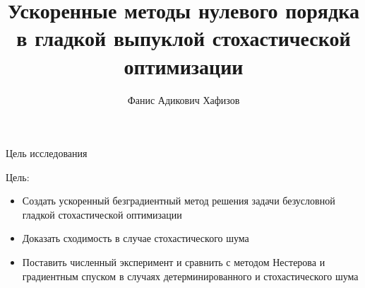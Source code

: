 \documentclass{beamer}
\title[\hbox to 56mm{Ускоренные безградиентные методы}]{Ускоренные методы нулевого порядка в гладкой выпуклой стохастической оптимизации}
\author[Ф.\,А. Хафизов]{Фанис Адикович Хафизов}
\institute{Московский физико-технический институт}
\date{\footnotesize
\par\smallskip\emph{Курс:} Автоматизация научных исследований\par (практика, В.\,В.~Стрижов)/Группа 105
\par\smallskip\emph{Эксперт:} к.ф.-м.н А.\,Н.~Безносиков
\par\smallskip\emph{Консультант:} А.\,И.~Богданов
\par\bigskip\small 2024}
\begin{document}
\begin{frame}
\thispagestyle{empty}
\maketitle
\end{frame}
\begin{frame}{Цель исследования}
\begin{block}{Цель:}
\begin{itemize}
 \item Создать ускоренный безградиентный метод решения задачи безусловной гладкой стохастической оптимизации
 \item Доказать сходимость в случае стохастического шума
 \item Поставить численный эксперимент и сравнить с методом Нестерова и градиентным спуском в случаях детерминированного и стохастического шума
\end{itemize}

\end{block}
\end{frame}
%
%
%
%
%
\end{document}
